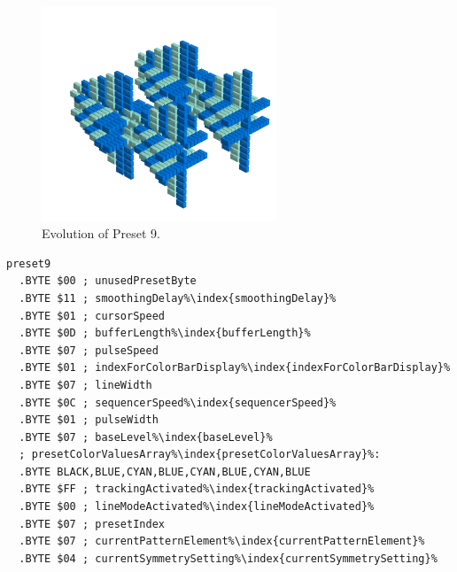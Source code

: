 \clearpage
\begin{minipage}[b]{0.48\linewidth}
\begin{figure}[H]                                                          
  \centering                                                             
  \begin{adjustbox}{width=7cm,center}                                   
  \includegraphics[width=7cm]{src/presets/pattern9-45.png}%
  \end{adjustbox}                                                        
\caption{Evolution of Preset 9.}                                           
\end{figure}                                                               
\end{minipage}
\hspace{0.1cm}
\begin{minipage}[b]{0.48\linewidth}                                       
\begin{lstlisting}[basicstyle=\ttfamily\scriptsize,caption=Data structure for Preset 9.,escapechar=\%]
preset9
  .BYTE $00 ; unusedPresetByte
  .BYTE $11 ; smoothingDelay%\index{smoothingDelay}%
  .BYTE $01 ; cursorSpeed
  .BYTE $0D ; bufferLength%\index{bufferLength}%
  .BYTE $07 ; pulseSpeed
  .BYTE $01 ; indexForColorBarDisplay%\index{indexForColorBarDisplay}%
  .BYTE $07 ; lineWidth
  .BYTE $0C ; sequencerSpeed%\index{sequencerSpeed}%
  .BYTE $01 ; pulseWidth
  .BYTE $07 ; baseLevel%\index{baseLevel}%
  ; presetColorValuesArray%\index{presetColorValuesArray}%: 
  .BYTE BLACK,BLUE,CYAN,BLUE,CYAN,BLUE,CYAN,BLUE
  .BYTE $FF ; trackingActivated%\index{trackingActivated}%
  .BYTE $00 ; lineModeActivated%\index{lineModeActivated}%
  .BYTE $07 ; presetIndex
  .BYTE $07 ; currentPatternElement%\index{currentPatternElement}%
  .BYTE $04 ; currentSymmetrySetting%\index{currentSymmetrySetting}%
\end{lstlisting}
\end{minipage}

